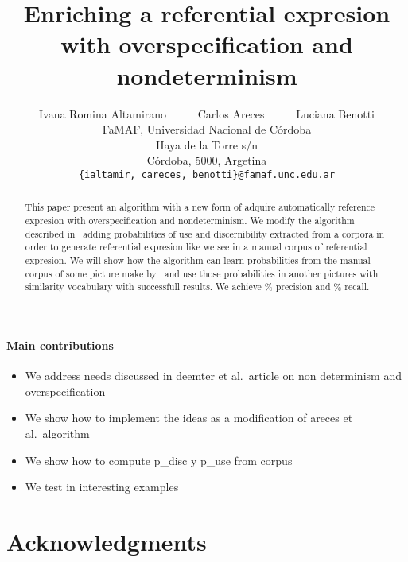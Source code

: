 \documentclass[11pt,letterpaper]{article}
\title{Enriching a referential expresion with overspecification and nondeterminism}
\author{Ivana Romina Altamirano 
	  \ \ \ \ \ 
	Carlos Areces
	  \ \ \ \ \ 
	Luciana Benotti\\
	    FaMAF, Universidad Nacional de C\'ordoba\\
	    Haya de la Torre s/n\\
	    C\'ordoba, 5000, Argetina\\
	    	    {\tt \{ialtamir, careces, benotti\}@famaf.unc.edu.ar}	    }
\date{}
\newcommand{\pdisc}{\small \textsf{p\_disc}\xspace}
\newcommand{\puse}{\small \textsf{p\_use}\xspace}
\begin{document}
\maketitle
\begin{abstract}
  This paper present an algorithm with a new form of adquire automatically reference expresion with overspecification and nondeterminism. We modify the algorithm described in~\cite{arec2} adding probabilities of use and discernibility extracted from a corpora in order to generate referential expresion like we see in a manual corpus of referential expresion. We will show how the algorithm can learn probabilities from the manual corpus of some picture make by~\cite{viethen-dale} and use those probabilities in another pictures with similarity vocabulary with successfull results. We achieve \% precision and \% recall. 
\end{abstract}

\paragraph{Main contributions}
\begin{itemize}
\item We address needs discussed in deemter et al.\ article on non determinism and overspecification
\item We show how to implement the ideas as a modification of areces et al.\ algorithm
\item We show how to compute \pdisc y \puse from corpus
\item We test in interesting examples
\end{itemize}









\section*{Acknowledgments}



\end{document}
